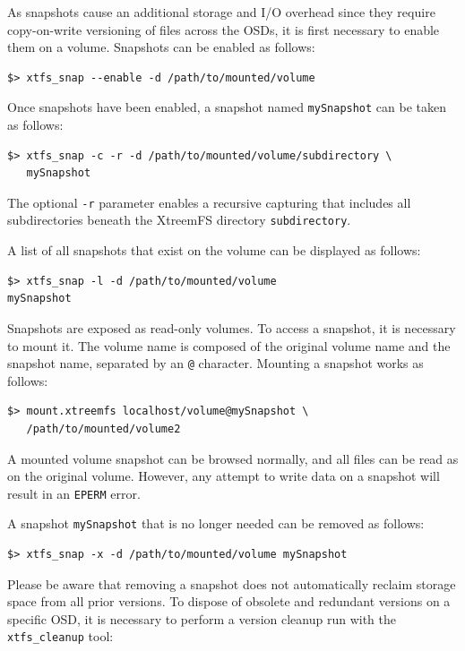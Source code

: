 \documentclass[a4paper,10pt]{book}
\begin{document}
As snapshots cause an additional storage and I/O overhead since they require copy-on-write versioning of files across the OSDs, it is first necessary to enable them on a volume. Snapshots can be enabled as follows:

\begin{verbatim}
$> xtfs_snap --enable -d /path/to/mounted/volume
\end{verbatim}

Once snapshots have been enabled, a snapshot named \texttt{mySnapshot} can be taken as follows:

\begin{verbatim}
$> xtfs_snap -c -r -d /path/to/mounted/volume/subdirectory \
   mySnapshot
\end{verbatim}

The optional \texttt{-r} parameter enables a recursive capturing that includes all subdirectories beneath the XtreemFS directory \texttt{subdirectory}.

A list of all snapshots that exist on the volume can be displayed as follows:

\begin{verbatim}
$> xtfs_snap -l -d /path/to/mounted/volume
mySnapshot
\end{verbatim}

Snapshots are exposed as read-only volumes. To access a snapshot, it is necessary to mount it. The volume name is composed of the original volume name and the snapshot name, separated by an \texttt{@} character. Mounting a snapshot works as follows:

\begin{verbatim}
$> mount.xtreemfs localhost/volume@mySnapshot \
   /path/to/mounted/volume2
\end{verbatim}

A mounted volume snapshot can be browsed normally, and all files can be read as on the original volume. However, any attempt to write data on a snapshot will result in an \texttt{EPERM} error.

A snapshot \texttt{mySnapshot} that is no longer needed can be removed as follows:

\begin{verbatim}
$> xtfs_snap -x -d /path/to/mounted/volume mySnapshot
\end{verbatim}

Please be aware that removing a snapshot does not automatically reclaim storage space from all prior versions. To dispose of obsolete and redundant versions on a specific OSD, it is necessary to perform a version cleanup run with the \texttt{xtfs\_cleanup} tool:
\end{document}
